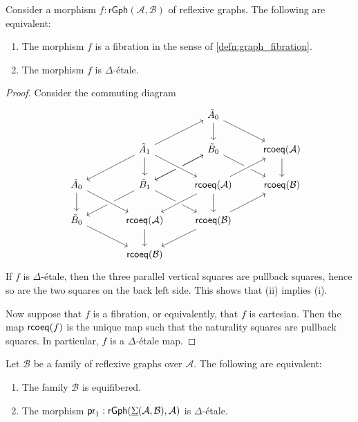 \begin{thm}\label{thm:etale_fibration}
Consider a morphism $f:\mathsf{rGph}(\mathcal{A},\mathcal{B})$ of reflexive graphs. The following are equivalent:
\begin{enumerate}
\item The morphism $f$ is a fibration in the sense of \cref{defn:graph_fibration}.
\item The morphism $f$ is $\Delta$-\'etale.
\end{enumerate}
\end{thm}

\begin{proof}
Consider the commuting diagram
\begin{equation*}
\begin{tikzcd}
& & \pts{\tilde A} \arrow[d] \arrow[dr] \\
& \edg{\tilde A} \arrow[dl] \arrow[d] \arrow[ur] & \pts{\tilde B} \arrow[dl] \arrow[dr] & \rcoeq(\mathcal{A}) \arrow[d] \\
\pts{\tilde A} \arrow[d] & \edg{\tilde B} \arrow[dl] \arrow[dr] \arrow[ur] & \rcoeq(\mathcal{A}) \arrow[from=ul,crossing over] \arrow[dl,crossing over] \arrow[d] \arrow[ur,crossing over] & \rcoeq(\mathcal{B}) \\
\pts{\tilde B} \arrow[dr] & \rcoeq(\mathcal{A}) \arrow[d] \arrow[from=ul,crossing over] & \rcoeq(\mathcal{B}) \arrow[dl] \arrow[ur] \\
\phantom{\rcoeq(\mathcal{B})} & \rcoeq(\mathcal{B})
\end{tikzcd}
\end{equation*}
If $f$ is $\Delta$-\'etale, then the three parallel vertical squares are pullback squares, hence so are the two squares on the back left side. This shows that (ii) implies (i). 

Now suppose that $f$ is a fibration, or equivalently, that $f$ is cartesian. Then the map $\mathsf{rcoeq}(f)$ is the unique map such that the naturality squares are pullback squares. In particular, $f$ is a $\Delta$-\'etale map.
\end{proof}

\begin{cor}
Let $\mathcal{B}$ be a family of reflexive graphs over $\mathcal{A}$. The following are equivalent:
\begin{enumerate}
\item The family $\mathcal{B}$ is equifibered.
\item The morphism $\mathsf{pr}_{1} : \mathsf{rGph}(\underline{\Sigma}(\mathcal{A},\mathcal{B}),\mathcal{A})$ is $\Delta$-\'etale.
\end{enumerate}
\end{cor}

